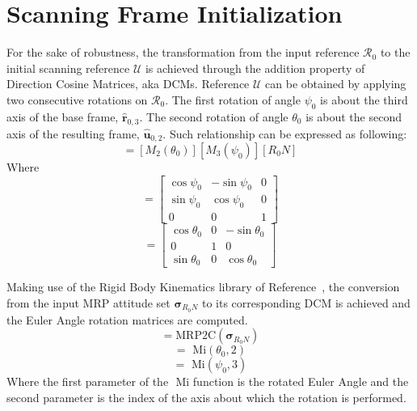 \documentclass[]{AVSSimReportMemo}
\begin{document}
\section{Scanning Frame Initialization}
For the sake of robustness, the transformation from the input reference $\mathcal{R}_0$ to the initial scanning reference  $\mathcal{U}$ is achieved through the addition property of Direction Cosine Matrices, aka DCMs. 
Reference $\mathcal{U}$ can be obtained by applying two consecutive rotations on $\mathcal{R}_0$. The first rotation of angle  $\psi_0$ is about the third axis of the base frame, $\hat {\bm r}_{0,3}$. The second rotation of angle $\theta_0$ is about the second axis of the resulting frame, $\hat {\bm u}_{0,2}$. Such relationship can be expressed as following:
\begin{equation}
	[UN] = [M_2( \theta_0)][M_3(\psi_0)][R_{0}N]
\end{equation}
Where
\begin{equation}
  [M_3(\psi_0)] =  
  	\begin{bmatrix}
    		\cos\psi_0 & -\sin\psi_0 & 0 \\
    		\sin\psi_0 & \cos\psi_0 &0 \\
    		0 & 0 & 1
	\end{bmatrix}
\end{equation}
\begin{equation}
  [M_2(\theta_0)] =  
  	\begin{bmatrix}
  		\cos\theta_0 & 0 & -\sin\theta_0  \\
    		0 & 1 & 0 \\
    		\sin\theta_0 & 0 & \cos\theta_0  
	\end{bmatrix}
\end{equation}

Making use of the Rigid Body Kinematics library of Reference~, the conversion from the input MRP attitude set $\bm{\sigma}_{R_{0}N}$ to its corresponding DCM is achieved and the Euler Angle rotation matrices are computed. 
\begin{equation}
	[R_{0}N] = \textrm{MRP2C}(\bm{\sigma}_{R_{0}N})
\end{equation}
\begin{equation}
	[M_2] = \textrm{ Mi}(\theta_0, 2)
\end{equation}
\begin{equation}
	[M_3] =\textrm{ Mi}(\psi_0, 3)
\end{equation}
Where the first parameter of the $\textrm{ Mi}$ function is the rotated Euler Angle and the second parameter is the index of the axis about which the rotation is performed.
\end{document}
